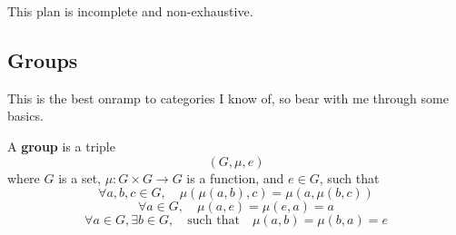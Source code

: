 \documentclass{article}
\begin{document}
This plan is incomplete and non-exhaustive.




\subsection*{Groups}
This is the best onramp to categories I know of, so bear with me through some basics.
\begin{definition}
    A {\bf group} is a triple \[ (G,\mu,e)\] where $G$ is a set, 
    $\mu:G\times G\to G$ is a function, and $e\in G$, such that 
    \begin{equation*}\tag{Associativity}
        \forall a,b,c\in G, \quad \mu(\mu(a,b),c) = \mu(a,\mu(b,c))
    \end{equation*}
    \begin{equation*}\tag{Identity}
        \forall a\in G, \quad \mu(a,e) = \mu(e,a) = a
    \end{equation*}
    \begin{equation*}\tag{Inverse}
        \forall a\in G, \exists b\in G, \quad\text{such that}\quad \mu(a,b)=\mu(b,a)=e
    \end{equation*}
\end{definition}
\end{document}
